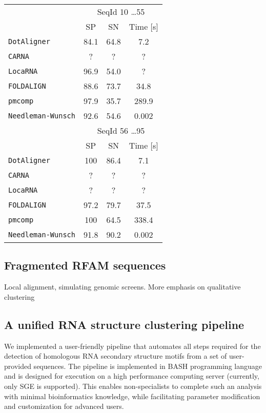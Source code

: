 \documentclass[a4paper,twoside]{article}
\newcommand\dotaligner{\texttt{DotAligner}}
\newcommand\pmcomp{\texttt{pmcomp}}
\newcommand\locarna{\texttt{LocaRNA}}
\newcommand\foldalign{\texttt{FOLDALIGN}}
\newcommand\carna{\texttt{CARNA}}
\newcommand\nw{\texttt{Needleman-Wunsch}}
\begin{document}
\begin{tabular}{|l|c|c|c|}
\hline 
 & \multicolumn{3}{c|}{SeqId 10 \ldots 55} \\
 & SP & SN & Time [s] \\ 
\hline 
\dotaligner & 84.1 & 64.8 & 7.2 \\ 
\carna & ? & ? & ? \\ 
\locarna & 96.9 & 54.0 & ? \\ 
\foldalign & 88.6 & 73.7 & 34.8 \\ 
\pmcomp & 97.9 & 35.7 & 289.9 \\ 
\nw & 92.6 & 54.6 & 0.002 \\
\hline 
\hline 
 & \multicolumn{3}{c|}{SeqId 56 \ldots 95} \\
 & SP & SN & Time [s] \\ 
\dotaligner & 100 & 86.4 & 7.1 \\ 
\carna & ? & ? & ? \\ 
\locarna & ? & ? & ? \\ 
\foldalign & 97.2 & 79.7 & 37.5 \\ 
\pmcomp & 100 & 64.5 & 338.4 \\ 
\nw & 91.8 & 90.2 & 0.002 \\
\hline 
\end{tabular} 


\subsection{Fragmented RFAM sequences} 

Local alignment, simulating genomic screens. More emphasis on qualitative clustering

\subsection{ A unified RNA structure clustering pipeline }

\noindent We implemented a user-friendly pipeline that automates all steps required 
for the detection of homologous RNA secondary structure motifs from a set of user-
provided sequences. The pipeline is implemented in BASH programming language and is 
designed for execution on a high performance computing server (currently, only SGE 
is supported). This enables non-specialists to complete such an analysis with 
minimal bioinformatics knowledge, while facilitating parameter modification and 
customization for advanced users. 
\end{document}
